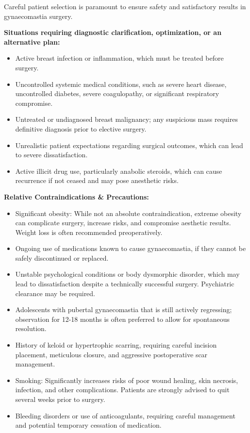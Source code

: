 Careful patient selection is paramount to ensure safety and satisfactory results in gynaecomastia surgery.

\textbf{Situations requiring diagnostic clarification, optimization, or an alternative plan:}
\begin{itemize}
  \item Active breast infection or inflammation, which must be treated before surgery.
  \item Uncontrolled systemic medical conditions, such as severe heart disease, uncontrolled diabetes, severe coagulopathy, or significant respiratory compromise.
  \item Untreated or undiagnosed breast malignancy; any suspicious mass requires definitive diagnosis prior to elective surgery.
  \item Unrealistic patient expectations regarding surgical outcomes, which can lead to severe dissatisfaction.
  \item Active illicit drug use, particularly anabolic steroids, which can cause recurrence if not ceased and may pose anesthetic risks.
\end{itemize}

\textbf{Relative Contraindications \& Precautions:}
\begin{itemize}
  \item Significant obesity: While not an absolute contraindication, extreme obesity can complicate surgery, increase risks, and compromise aesthetic results. Weight loss is often recommended preoperatively.
  \item Ongoing use of medications known to cause gynaecomastia, if they cannot be safely discontinued or replaced.
  \item Unstable psychological conditions or body dysmorphic disorder, which may lead to dissatisfaction despite a technically successful surgery. Psychiatric clearance may be required.
  \item Adolescents with pubertal gynaecomastia that is still actively regressing; observation for 12-18 months is often preferred to allow for spontaneous resolution.
  \item History of keloid or hypertrophic scarring, requiring careful incision placement, meticulous closure, and aggressive postoperative scar management.
  \item Smoking: Significantly increases risks of poor wound healing, skin necrosis, infection, and other complications. Patients are strongly advised to quit several weeks prior to surgery.
  \item Bleeding disorders or use of anticoagulants, requiring careful management and potential temporary cessation of medication.
\end{itemize}

